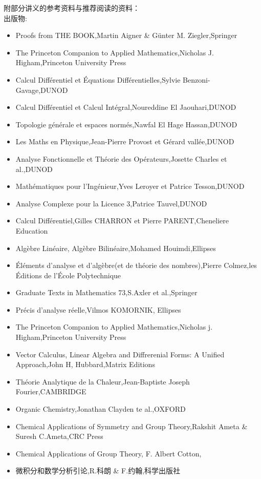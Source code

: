 \documentclass[12pt, a4paper, oneside]{ctexbook}
\begin{document}
\noindent
附部分讲义的参考资料与推荐阅读的资料：\\
出版物:
\begin{itemize}
  \item Proofs from THE BOOK,Martin Aigner \& Günter M. Ziegler,Springer
  \item The Princeton Companion to Applied Mathematics,Nicholas J. Higham,Princeton University Press
  \item Calcul Différentiel et Équations Différentielles,Sylvie Benzoni-Gavage,DUNOD
  \item Calcul Différentiel et Calcul Intégral,Noureddine El Jaouhari,DUNOD
  \item Topologie générale et espaces normés,Nawfal El Hage Hassan,DUNOD
  \item Les Maths en Physique,Jean-Pierre Provost et Gérard vallée,DUNOD
  \item Analyse Fonctionnelle et Théorie des Opérateurs,Josette Charles et al.,DUNOD
  \item Mathématiques pour l'Ingénieur,Yves Leroyer et Patrice Tesson,DUNOD
  \item Analyse Complexe pour la Licence 3,Patrice Tauvel,DUNOD
  \item Calcul Différentiel,Gilles CHARRON et Pierre PARENT,Cheneliere Education
  \item Algèbre Linéaire, Algèbre Bilinéaire,Mohamed Houimdi,Ellipses
  \item Éléments d'analyse et d'algèbre(et de théorie des nombres),Pierre Colmez,les Éditions de l'École Polytechnique
  \item Graduate Texts in Mathematics 73,S.Axler et al.,Springer
  \item Précis d'analyse réelle,Vilmos KOMORNIK, Ellipses
  \item The Princeton Companion to Applied Mathematics,Nicholas j. Higham,Princeton University Press
  \item Vector Calculus, Linear Algebra and Diffrerenial Forms: A Unified Approach,John H, Hubbard,Matrix Editions
  \item Théorie Analytique de la Chaleur,Jean-Baptiste Joseph Fourier,CAMBRIDGE
  \item Organic Chemistry,Jonathan Clayden te al.,OXFORD
  \item Chemical Applications of Symmetry and Group Theory,Rakshit Ameta \& Suresh C.Ameta,CRC Press
  \item Chemical Applications of Group Theory, F. Albert Cotton,
  \item 微积分和数学分析引论,R.科朗 \& F.约翰,科学出版社

\end{itemize}
\end{document}
